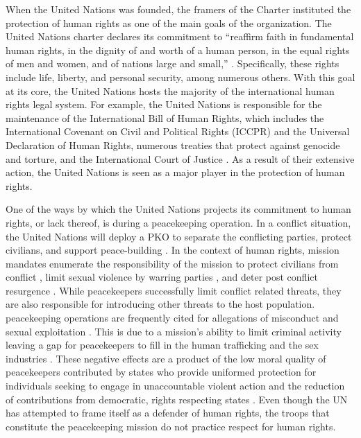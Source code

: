 \documentclass[12pt]{article}
\newcommand{\UN}[1]{United Nations}
\newcommand{\PKOs}[1]{peacekeeping operations}
\begin{document}
When the \UN{} was founded, the framers of the Charter instituted the protection of human rights as one of the main goals of the organization. The \UN{} charter declares its commitment to ``reaffirm faith in fundamental human rights, in the dignity of and worth of a human person, in the equal rights of men and women, and of nations large and small,'' \citep[p. 80]{krasno2004united}. Specifically, these rights include life, liberty, and personal security, among numerous others. With this goal at its core, the \UN{} hosts the majority of the international human rights legal system. For example, the \UN{} is responsible for the maintenance of the International Bill of Human Rights, which includes the International Covenant on Civil and Political Rights (ICCPR) and the Universal Declaration of Human Rights, numerous treaties that protect against genocide and torture, and the International Court of Justice \citep{hafner2013making}. As a result of their extensive action, the \UN{} is seen as a major player in the protection of human rights. 

One of the ways by which the \UN{} projects its commitment to human rights, or lack thereof, is during a peacekeeping operation. In a conflict situation, the \UN{} will deploy a PKO to separate the conflicting parties, protect civilians, and support peace-building \citep{doyle2000international}. In the context of human rights, mission mandates enumerate the responsibility of the mission to protect civilians from conflict \citep{hultman2013united}, limit sexual violence by warring parties \citep{kirschner2019does}, and deter post conflict resurgence \citep{kathman2019cut,ruggeri2017winning}. While peacekeepers successfully limit conflict related threats, they are also responsible for introducing other threats to the host population. \PKOs{} are frequently cited for allegations of misconduct and sexual exploitation \citep{karim2016explaining}. This is due to a mission's ability to limit criminal activity leaving a gap for peacekeepers to fill in the human trafficking and the sex industries \citep{horne2019impact}. These negative effects are a product of the low moral quality of peacekeepers contributed by states who provide uniformed protection for individuals seeking to engage in unaccountable violent action \citep{horne2020relationship} and the reduction of contributions from democratic, rights respecting states \citep{levin2016selectorate}. Even though the UN has attempted to frame itself as a defender of human rights, the troops that constitute the peacekeeping mission do not practice respect for human rights.\footnotemark[3]
\end{document}
